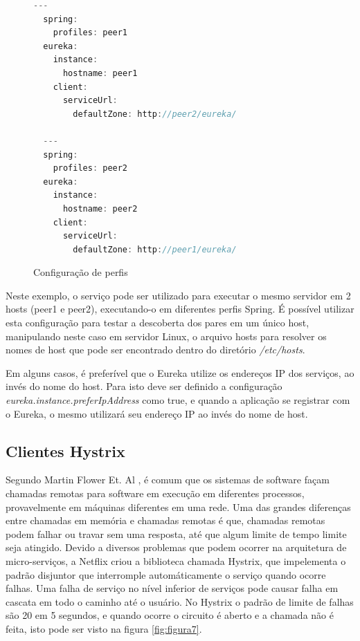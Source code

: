 \documentclass[journal]{IEEEtran}
\begin{document}
\begin{figure}[h]
\centering

\begin{lstlisting}[language=Java]
  ---
  spring:
    profiles: peer1
  eureka:
    instance:
      hostname: peer1
    client:
      serviceUrl:
        defaultZone: http://peer2/eureka/

  ---
  spring:
    profiles: peer2
  eureka:
    instance:
      hostname: peer2
    client:
      serviceUrl:
        defaultZone: http://peer1/eureka/
\end{lstlisting}

\caption{Configuração de perfis}
\label{alg:figuranove}
\end{figure}

Neste exemplo, o serviço pode ser utilizado para executar o mesmo servidor em 2 hosts (peer1 e peer2), executando-o em diferentes perfis Spring. É possível utilizar esta configuração para testar a descoberta dos pares em um único host, manipulando neste caso em servidor Linux, o arquivo hosts para resolver os nomes de host que pode ser encontrado dentro do diretório \emph{/etc/hosts}.

Em alguns casos, é preferível que o Eureka utilize os endereços IP dos serviços, ao invés do nome do host. Para isto deve ser definido a configuração \emph{eureka.instance.preferIpAddress} como true, e quando a aplicação se registrar com o Eureka, o mesmo utilizará seu endereço IP ao invés do nome de host.

\subsection{Clientes Hystrix}

Segundo Martin Flower Et. Al \cite{martinfowleretal}, é comum que os sistemas de software façam chamadas remotas para software em execução em diferentes processos, provavelmente em máquinas diferentes em uma rede. Uma das grandes diferenças entre chamadas em memória e chamadas remotas é que, chamadas remotas podem falhar ou travar sem uma resposta, até que algum limite de tempo limite seja atingido. Devido a diversos problemas que podem ocorrer na arquitetura de micro-serviços, a Netflix criou a biblioteca chamada Hystrix, que impelementa o padrão disjuntor que interromple automáticamente o serviço quando ocorre falhas. Uma falha de serviço no nível inferior de serviços pode causar falha em cascata em todo o caminho até o usuário. No Hystrix o padrão de limite de falhas são 20 em 5 segundos, e quando ocorre o circuito é aberto e a chamada não é feita, isto pode ser visto na figura \ref{fig:figura7}.
\end{document}
